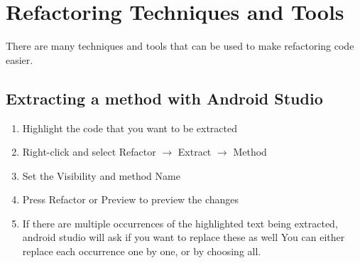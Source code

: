 \documentclass[]{article}
\begin{document}
\section{Refactoring Techniques and Tools}
There are many techniques and tools that can be used to make refactoring code easier.
\subsection{Extracting a method with Android Studio}
\begin{enumerate}
	\item  Highlight the code that you want to be extracted
	\item Right-click and select Refactor $\rightarrow$ Extract $\rightarrow$ Method
	\item Set the Visibility and method Name 
	\item Press Refactor or Preview to preview the changes
	\item If there are multiple occurrences of the highlighted text being extracted, android studio will ask if you want to replace these as well 
	\subitem You can either replace each occurrence one by one, or by choosing all.
\end{enumerate}
\end{document}
